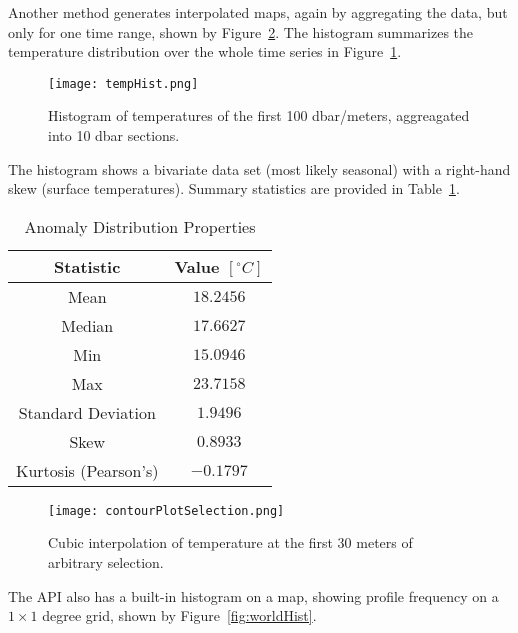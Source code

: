 Another method generates interpolated maps, again by aggregating the data, but only for one time range, shown by Figure~\ref{fig:contourPlotSelection}.
The histogram summarizes the temperature distribution over the whole time series in Figure~\ref{fig:tempHist}.

\begin{figure}[H]
\centering
\begin{minipage}{4in}
\texttt{[image: tempHist.png]}
\caption{\label{fig:tempHist}Histogram of temperatures of the first 100 dbar/meters, aggreagated into 10 dbar sections.}
\end{minipage}
\end{figure}

The histogram shows a bivariate data set (most likely seasonal) with a right-hand skew (surface temperatures). Summary statistics are provided in Table~\ref{tbl:tempHist}.

\begin{table}[hbt]
\centering
\caption{Anomaly Distribution Properties \label{tbl:tempHist}}
{\begin{tabular}{|c|c|}
\hline
\textbf{Statistic} & \textbf{Value} $[^\circ C]$
\\ \hline
Mean\hphantom{00} & \hphantom{0}$18.2456$
\\ \hline
Median\hphantom{00} & \hphantom{0}$17.6627$
\\ \hline
Min\hphantom{00} & \hphantom{0}$15.0946$
\\ \hline
Max\hphantom{00} & \hphantom{0}$23.7158$
\\ \hline
Standard Deviation\hphantom{00} & \hphantom{0}$1.9496$
\\ \hline
Skew\hphantom{00} & $0.8933$
\\ \hline
Kurtosis (Pearson's) \hphantom{00} & $-0.1797$
\\ \hline
\end{tabular} }
\end{table}

\begin{figure}[H]
\centering
\begin{minipage}{4in}
\texttt{[image: contourPlotSelection.png]}
\caption{\label{fig:contourPlotSelection}Cubic interpolation of temperature at the first 30 meters of arbitrary selection.}
\end{minipage}
\end{figure}

The API also has a built-in histogram on a map, showing profile frequency on a $1\times 1$ degree grid, shown by Figure~\ref{fig:worldHist}.


